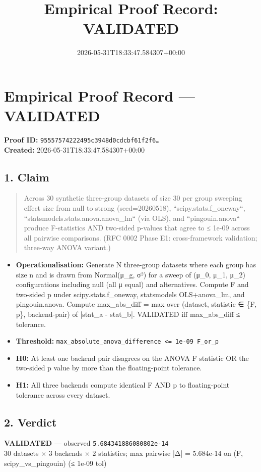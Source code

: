\documentclass{article}
\title{Empirical Proof Record: VALIDATED}
\date{2026-05-31T18:33:47.584307+00:00}
\begin{document}
\maketitle
\section*{Empirical Proof Record --- \textcolor{validated}{\textbf{VALIDATED}}}
\textbf{Proof ID:} \texttt{95557574222495c3948d0cdcbf61f2f6\dots}\\
\textbf{Created:} 2026-05-31T18:33:47.584307+00:00
\subsection*{1. Claim}
\begin{quote}Across 30 synthetic three-group datasets of size 30 per group sweeping effect size from null to strong (seed=20260518), ``scipy.stats.f\_oneway``, ``statsmodels.stats.anova.anova\_lm`` (via OLS), and ``pingouin.anova`` produce F-statistics AND two-sided p-values that agree to ≤ 1e-09 across all pairwise comparisons. (RFC 0002 Phase E1: cross-framework validation; three-way ANOVA variant.)\end{quote}
\begin{itemize}
\item \textbf{Operationalisation:} Generate N three-group datasets where each group has size n and is drawn from Normal(μ\_g, σ²) for a sweep of (μ\_0, μ\_1, μ\_2) configurations including null (all μ equal) and alternatives. Compute F and two-sided p under scipy.stats.f\_oneway, statsmodels OLS+anova\_lm, and pingouin.anova. Compute max\_abs\_diff = max over (dataset, statistic ∈ \{F, p\}, backend-pair) of |stat\_a - stat\_b|. VALIDATED iff max\_abs\_diff ≤ tolerance.
\item \textbf{Threshold:} \texttt{max\_absolute\_anova\_difference <= 1e-09 F\_or\_p}
\item \textbf{H0:} At least one backend pair disagrees on the ANOVA F statistic OR the two-sided p value by more than the floating-point tolerance.
\item \textbf{H1:} All three backends compute identical F AND p to floating-point tolerance across every dataset.
\end{itemize}
\subsection*{2. Verdict}
\textcolor{validated}{\textbf{VALIDATED}} --- observed \texttt{5.684341886080802e-14}\\
30 datasets × 3 backends × 2 statistics; max pairwise |Δ| = 5.684e-14 on (F, scipy\_vs\_pingouin) (≤ 1e-09 tol)
\end{document}
